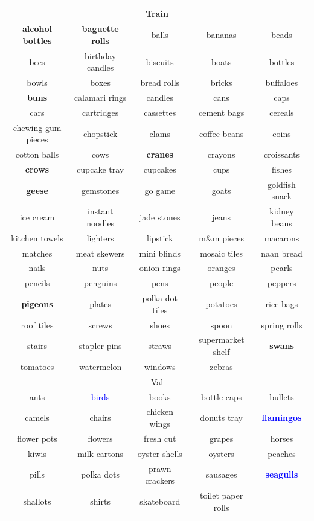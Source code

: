 \begin{tabular}{ccccc}
 \toprule

\multicolumn{5}{c}{Train} \\
\midrule
\textbf{alcohol bottles}&\textbf{baguette rolls}&balls&bananas&beads\\
bees&birthday candles&biscuits&boats&bottles\\
bowls&boxes&bread rolls&bricks&buffaloes\\
\textbf{buns}&calamari rings&candles&cans&caps\\
cars&cartridges&cassettes&cement bags&cereals\\
chewing gum pieces&chopstick&clams&coffee beans&coins\\
cotton balls&cows&\textbf{cranes}&crayons&croissants\\
\textbf{crows}&cupcake tray&cupcakes&cups&fishes\\
\textbf{geese}&gemstones&go game&goats&goldfish snack\\
ice cream&instant noodles&jade stones&jeans&kidney beans\\
kitchen towels&lighters&lipstick&m\&m pieces&macarons\\
matches&meat skewers&mini blinds&mosaic tiles&naan bread\\
nails&nuts&onion rings&oranges&pearls\\
pencils&penguins&pens&people&peppers\\
\textbf{pigeons}&plates&polka dot tiles&potatoes&rice bags\\
roof tiles&screws&shoes&spoon&spring rolls\\
stairs&stapler pins&straws&supermarket shelf&\textbf{swans}\\
tomatoes&watermelon&windows&zebras\\

\midrule
\multicolumn{5}{c}{Val} \\
\midrule
ants&\textcolor{blue}{birds}&books&bottle caps&bullets\\
camels&chairs&chicken wings&donuts tray&\textbf{\textcolor{blue}{flamingos}}\\
flower pots&flowers&fresh cut&grapes&horses\\
kiwis&milk cartons&oyster shells&oysters&peaches\\
pills&polka dots&prawn crackers&sausages&\textbf{\textcolor{blue}{seagulls}}\\
shallots&shirts&skateboard&toilet paper rolls\\


\end{tabular}
